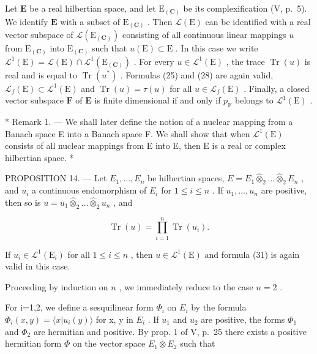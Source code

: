 Let \(\mathbf{E}\) be a real hilbertian space, and let \(\mathrm{E}_{(\mathbf{C})}\) be its complexification (V, p.~5). We identify \(\mathbf{E}\) with a subset of \(\mathrm{E}_{(\mathbf{C})}\) . Then \(\mathcal{L}(\mathrm{E})\) can be identified with a real vector subspace of \(\mathcal{L}(\mathrm{E}_{(\mathbf{C})})\) consisting of all continuous linear mappings \(u\) from \(\mathrm{E}_{(\mathbf{C})}\) into \(\mathrm{E}_{(\mathbf{C})}\) such that \(u(\mathrm{E}) \subset \mathrm{E}\) . In this case we write \(\mathcal{L}^1(\mathrm{E}) = \mathcal{L}(\mathrm{E}) \cap \mathcal{L}^1(\mathrm{E}_{(\mathbf{C})})\) . For every \(u \in \mathcal{L}^1(\mathrm{E})\) , the trace \(\operatorname{Tr}(u)\) is real and is equal to \(\operatorname{Tr}(u^*)\) . Formulas (25) and (28) are again valid, \(\mathcal{L}_f(\mathrm{E}) \subset \mathcal{L}^1(\mathrm{E})\) and \(\operatorname{Tr}(u) = \tau(u)\) for all \(u \in \mathcal{L}_f(\mathrm{E})\) . Finally, a closed vector subspace \(\mathbf{F}\) of \(\mathbf{E}\) is finite dimensional if and only if \(p_{\mathrm{F}}\) belongs to \(\mathcal{L}^1(\mathrm{E})\) .

* Remark 1. --- We shall later define the notion of a nuclear mapping from a Banach space E into a Banach space F. We shall show that when \(\mathcal{L}^1 (\mathrm{E})\) consists of all nuclear mappings from E into E, then E is a real or complex hilbertian space. *

PROPOSITION 14. --- Let \(E_{1}, \ldots, E_{n}\) be hilbertian spaces, \(E = E_{1} \hat{\otimes}_{2} \ldots \hat{\otimes}_{2} E_{n}\) , and \(u_{i}\) a continuous endomorphism of \(E_{i}\) for \(1 \leqslant i \leqslant n\) . If \(u_{1}, \ldots, u_{n}\) are positive, then so is \(u = u_{1} \hat{\otimes}_{2} \ldots \hat{\otimes}_{2} u_{n}\) , and

\[
\operatorname{Tr} (u) = \prod_ {i = 1} ^ {n} \operatorname{Tr} (u _ {i}).\tag{31}
\]

If \(u_{i} \in \mathcal{L}^{1}(\mathrm{E}_{i})\) for all \(1 \leqslant i \leqslant n\) , then \(u \in \mathcal{L}^{1}(\mathrm{E})\) and formula (31) is again valid in this case.

Proceeding by induction on \(n\) , we immediately reduce to the case \(n = 2\) .

For i=1,2, we define a sesquilinear form \(\Phi_{i}\) on \(E_{i}\) by the formula \(\Phi_{i}(x,y)=\langle x|u_{i}(y)\rangle\) for x, y in \(E_{i}\) . If \(u_{1}\) and \(u_{2}\) are positive, the forms \(\Phi_{1}\) and \(\Phi_{2}\) are hermitian and positive. By prop. 1 of V, p.~25 there exists a positive hermitian form \(\Phi\) on the vector space \(E_{1}\otimes E_{2}\) such that

